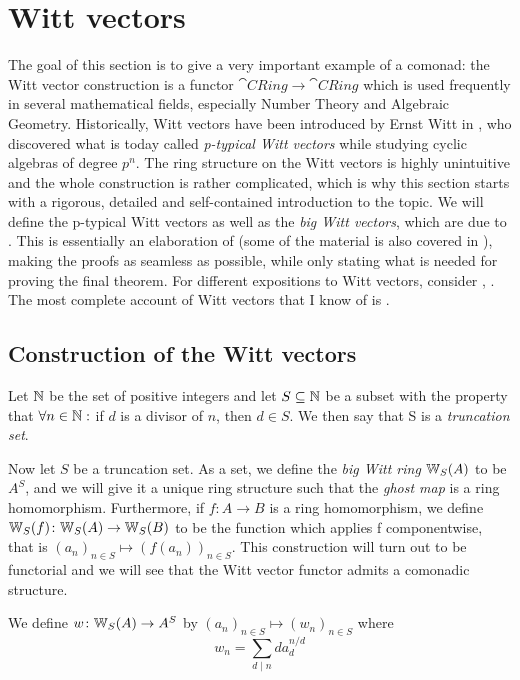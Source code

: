 \chapter{Witt vectors}
The goal of this section is to give a very important example of a comonad:
the Witt vector construction is a functor $\cat{CRing} \to \cat{CRing}$ which
is used frequently in several mathematical fields, especially Number Theory
and Algebraic Geometry. Historically, Witt vectors
have been introduced by Ernst Witt in \cite{witt}, who discovered what is today called 
\textit{p-typical Witt vectors} while studying cyclic algebras of degree $p^n$. 
The ring structure on the Witt vectors is highly unintuitive and
the whole construction is rather complicated, which is why this section starts with a 
rigorous, detailed and self-contained introduction to the topic. We will define the p-typical Witt vectors
as well as the \textit{big Witt vectors}, which are due to \cite{cartier}. This is essentially an elaboration of
\cite{HES} (some of the material is also covered in \cite{HES2}), making the proofs as seamless as possible, while only stating what is needed
for proving the final theorem. For different expositions to Witt vectors, consider
\cite{rabinoff}, \cite{serre}. 
The most complete account of Witt vectors that I know of is \cite{hazewinkel}.

\section{Construction of the Witt vectors}

\begin{definition}
    Let $\mathbb{N}$ be the set of positive integers and let $S\subseteq
    \mathbb{N}$ be a subset with the property that $\forall n\in \mathbb{N}:$
    if $d$ is a divisor of $n$, then $d\in S$.
    We then say that S is a \textit{truncation set}.
\end{definition}
Now let $S$ be a truncation set. As a set, we define the \textit{big Witt ring} $\mathbb{W}_S(A)$ to be $A^S$,
and we will give it a unique ring structure such that the \textit{ghost map}
is a ring homomorphism. Furthermore, if $f \colon A \to B$ is a ring homomorphism,
we define $\mathbb{W}_S(f) \colon \mathbb{W}_S(A) \to \mathbb{W}_S(B)$ to be the function which applies
f componentwise, that is 
$(a_n)_{n \in S} \mapsto (f(a_n))_{n \in S}$.
This construction will turn out to be functorial and we will
see that the Witt vector functor admits a comonadic structure.

\begin{definition}
    We define $w \colon \mathbb{W}_S(A) \to A^S$
    by $(a_n)_{n \in S} \mapsto (w_n)_{n \in S}$ where 
    \[
        w_n = \sum_{d \mid n} d a_d^{n/d}
    \]
\end{definition}

